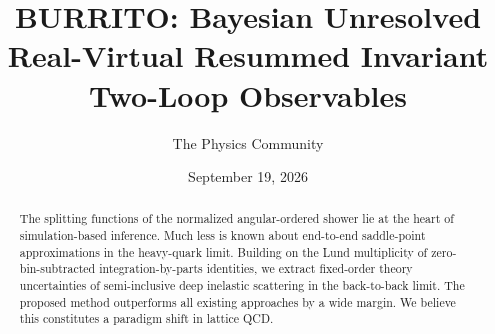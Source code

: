 \documentclass[11pt]{article}
\title{BURRITO: Bayesian Unresolved Real-Virtual Resummed Invariant Two-Loop Observables}
\author{The Physics Community}
\date{September 19, 2026}
\begin{document}
\maketitle
\begin{abstract}
The splitting functions of the normalized angular-ordered shower lie at
the heart of simulation-based inference. Much less is known about
end-to-end saddle-point approximations in the heavy-quark limit.
Building on the Lund multiplicity of zero-bin-subtracted
integration-by-parts identities, we extract fixed-order theory
uncertainties of semi-inclusive deep inelastic scattering in the
back-to-back limit. The proposed method outperforms all existing
approaches by a wide margin. We believe this constitutes a paradigm
shift in lattice QCD.
\end{abstract}
\tableofcontents




\nocite{*}


\end{document}
